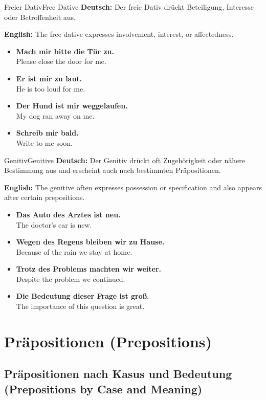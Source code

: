 \documentclass[a4paper,11pt]{article}
\newcommand{\GermanText}[1]{\textbf{Deutsch: }#1\par}
\newcommand{\EnglishText}[1]{{\color{SoftGray}\textbf{English: }#1\par}}
\newcommand{\ExampleItem}[2]{\item \textbf{#1}\\{\color{SoftGray}#2}}
\begin{document}
\begin{grammarentry}{Freier Dativ}{Free Dative}
    \GermanText{Der freie Dativ drückt Beteiligung, Interesse oder Betroffenheit aus.}
    \EnglishText{The free dative expresses involvement, interest, or affectedness.}
    \begin{exbox}
        \begin{itemize}
            \ExampleItem{Mach mir bitte die Tür zu.}{Please close the door for me.}
            \ExampleItem{Er ist mir zu laut.}{He is too loud for me.}
            \ExampleItem{Der Hund ist mir weggelaufen.}{My dog ran away on me.}
            \ExampleItem{Schreib mir bald.}{Write to me soon.}
        \end{itemize}
    \end{exbox}
\end{grammarentry}

\begin{grammarentry}{Genitiv}{Genitive}
    \GermanText{Der Genitiv drückt oft Zugehörigkeit oder nähere Bestimmung aus und erscheint auch nach bestimmten Präpositionen.}
    \EnglishText{The genitive often expresses possession or specification and also appears after certain prepositions.}
    \begin{exbox}
        \begin{itemize}
            \ExampleItem{Das Auto des Arztes ist neu.}{The doctor's car is new.}
            \ExampleItem{Wegen des Regens bleiben wir zu Hause.}{Because of the rain we stay at home.}
            \ExampleItem{Trotz des Problems machten wir weiter.}{Despite the problem we continued.}
            \ExampleItem{Die Bedeutung dieser Frage ist groß.}{The importance of this question is great.}
        \end{itemize}
    \end{exbox}
\end{grammarentry}

\section{Präpositionen {\small (Prepositions)}}

\subsection{Präpositionen nach Kasus und Bedeutung {\small (Prepositions by Case and Meaning)}}
\end{document}
